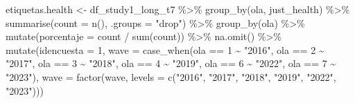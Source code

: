 \documentclass[
  12pt,
  letterpaper,
  DIV=11,
  numbers=noendperiod]{scrartcl}
\newenvironment{Shaded}{\begin{snugshade}}{\end{snugshade}}
\newcommand{\AttributeTok}[1]{\textcolor[rgb]{0.40,0.45,0.13}{#1}}
\newcommand{\DecValTok}[1]{\textcolor[rgb]{0.68,0.00,0.00}{#1}}
\newcommand{\FunctionTok}[1]{\textcolor[rgb]{0.28,0.35,0.67}{#1}}
\newcommand{\NormalTok}[1]{\textcolor[rgb]{0.00,0.23,0.31}{#1}}
\newcommand{\OtherTok}[1]{\textcolor[rgb]{0.00,0.23,0.31}{#1}}
\newcommand{\SpecialCharTok}[1]{\textcolor[rgb]{0.37,0.37,0.37}{#1}}
\newcommand{\StringTok}[1]{\textcolor[rgb]{0.13,0.47,0.30}{#1}}
\begin{document}
\begin{Shaded}
\begin{Highlighting}[]
\NormalTok{etiquetas.health }\OtherTok{\textless{}{-}}\NormalTok{ df\_study1\_long\_t7 }\SpecialCharTok{\%\textgreater{}\%}
  \FunctionTok{group\_by}\NormalTok{(ola, just\_health) }\SpecialCharTok{\%\textgreater{}\%}
  \FunctionTok{summarise}\NormalTok{(}\AttributeTok{count =} \FunctionTok{n}\NormalTok{(), }\AttributeTok{.groups =} \StringTok{"drop"}\NormalTok{) }\SpecialCharTok{\%\textgreater{}\%}
  \FunctionTok{group\_by}\NormalTok{(ola) }\SpecialCharTok{\%\textgreater{}\%}
  \FunctionTok{mutate}\NormalTok{(}\AttributeTok{porcentaje =}\NormalTok{ count }\SpecialCharTok{/} \FunctionTok{sum}\NormalTok{(count)) }\SpecialCharTok{\%\textgreater{}\%} 
  \FunctionTok{na.omit}\NormalTok{() }\SpecialCharTok{\%\textgreater{}\%} 
  \FunctionTok{mutate}\NormalTok{(}\AttributeTok{idencuesta =} \DecValTok{1}\NormalTok{,}
         \AttributeTok{wave =} \FunctionTok{case\_when}\NormalTok{(ola }\SpecialCharTok{==} \DecValTok{1} \SpecialCharTok{\textasciitilde{}} \StringTok{"2016"}\NormalTok{,}
\NormalTok{                          ola }\SpecialCharTok{==} \DecValTok{2} \SpecialCharTok{\textasciitilde{}} \StringTok{"2017"}\NormalTok{,}
\NormalTok{                          ola }\SpecialCharTok{==} \DecValTok{3} \SpecialCharTok{\textasciitilde{}} \StringTok{"2018"}\NormalTok{,}
\NormalTok{                          ola }\SpecialCharTok{==} \DecValTok{4} \SpecialCharTok{\textasciitilde{}} \StringTok{"2019"}\NormalTok{,}
\NormalTok{                          ola }\SpecialCharTok{==} \DecValTok{6} \SpecialCharTok{\textasciitilde{}} \StringTok{"2022"}\NormalTok{,}
\NormalTok{                          ola }\SpecialCharTok{==} \DecValTok{7} \SpecialCharTok{\textasciitilde{}} \StringTok{"2023"}\NormalTok{),}
         \AttributeTok{wave =} \FunctionTok{factor}\NormalTok{(wave, }\AttributeTok{levels =} \FunctionTok{c}\NormalTok{(}\StringTok{"2016"}\NormalTok{,}
                                        \StringTok{"2017"}\NormalTok{,}
                                        \StringTok{"2018"}\NormalTok{,}
                                        \StringTok{"2019"}\NormalTok{,}
                                        \StringTok{"2022"}\NormalTok{,}
                                        \StringTok{"2023"}\NormalTok{)))}





\end{Highlighting}
\end{Shaded}
\end{document}
